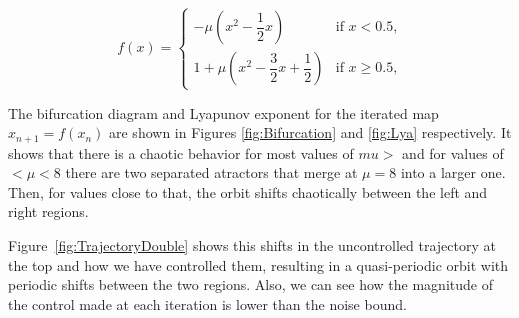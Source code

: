 \begin{equation}
f(x) = \left\{ \begin{array}{ll}
-\mu (x^2 - \dfrac{1}{2}x)  & \mbox{if $x<0.5$,} \\
1 + \mu (x^2 -\dfrac{3}{2}x + \dfrac{1}{2})  & \mbox{if $x\geq 0.5$,} 
\end{array}
\right.
\end{equation}

The bifurcation diagram and Lyapunov exponent for the iterated map $x_{n+1} = f(x_n)$ are shown in Figures \ref{fig:Bifurcation} and \ref{fig:Lya} respectively. It shows that there is a chaotic behavior for most values of $mu > $ and for values of $ < \mu < 8$ there are two separated atractors that merge at $\mu = 8$ into a larger one. Then, for values close to that, the orbit shifts chaotically between the left and right regions. 

Figure~\ref{fig:TrajectoryDouble} shows this shifts in the uncontrolled trajectory at the top and how we have controlled them, resulting in a quasi-periodic orbit with periodic shifts between the two regions. Also, we can see how the magnitude of the control made at each iteration is lower than the noise bound.


